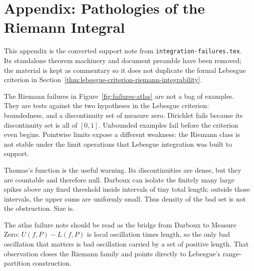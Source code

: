\section*{Appendix: Pathologies of the Riemann Integral}

\begin{remark*}
This appendix is the converted support note from
\texttt{integration-failures.tex}. Its standalone theorem machinery and
document preamble have been removed; the material is kept as commentary so it
does not duplicate the formal Lebesgue criterion in
Section~\ref{thm:lebesgue-criterion-riemann-integrability}.
\end{remark*}

\begin{remark*}
The Riemann failures in Figure~\ref{fig:failures-atlas} are not a bag of
examples. They are tests against the two hypotheses in the Lebesgue criterion:
boundedness, and a discontinuity set of measure zero. Dirichlet fails because
its discontinuity set is all of \([0,1]\). Unbounded examples fail before the
criterion even begins. Pointwise limits expose a different weakness: the
Riemann class is not stable under the limit operations that Lebesgue
integration was built to support.
\end{remark*}

\begin{remark*}
Thomae's function is the useful warning. Its discontinuities are dense, but
they are countable and therefore null. Darboux can isolate the finitely many
large spikes above any fixed threshold inside intervals of tiny total length;
outside those intervals, the upper sums are uniformly small. Thus density of
the bad set is not the obstruction. Size is.
\end{remark*}

\begin{remark*}
The atlas failure note should be read as the bridge from Darboux to Measure
Zero: \(U(f,P)-L(f,P)\) is local oscillation times length, so the only bad
oscillation that matters is bad oscillation carried by a set of positive
length. That observation closes the Riemann family and points directly to
Lebesgue's range-partition construction.
\end{remark*}
